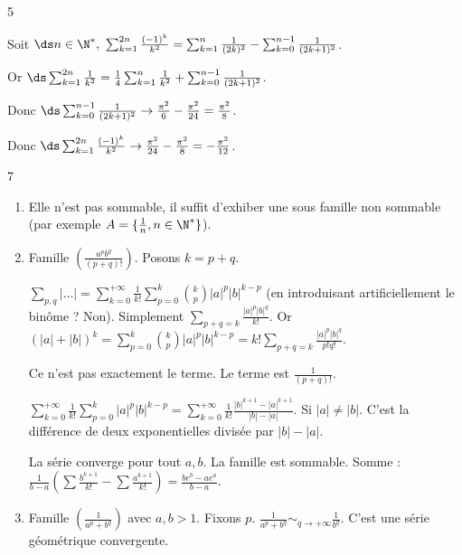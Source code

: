\begin{correction}{5}

Soit $\ds n \in \N^*,~ \sum_{k=1}^{2n} \frac {(-1)^k} {k^2} = \sum_{k=1}^n \frac 1 {(2k)^2} - \sum_{k=0}^{n-1} \frac 1 {(2k+1)^2}$.    

Or $\ds \sum_{k=1}^{2n} \frac 1 {k^2} = \frac 1 4 \sum_{k=1}^n \frac 1 {k^2} + \sum_{k=0}^{n-1} \frac 1 {(2k+1)^2}$.

Donc $\ds \sum_{k=0}^{n-1} \frac 1 {(2k+1)^2} \to \frac {\pi^2} 6 - \frac {\pi^2} {24} = \frac {\pi^2} 8$.

Donc $\ds \sum_{k=1}^{2n} \frac {(-1)^k} {k^2} \to \frac {\pi^2} {24} - \frac {\pi^2} 8 = - \frac {\pi^2} {12}$.
\end{correction}

\begin{correction}{7}
\begin{enumerate}
    \item Elle n'est pas sommable, il suffit d'exhiber une sous famille non sommable (par exemple $A = \{\frac 1 n, n \in \N^*\}$).
    
    \item 
        Famille $\left(\frac{a^p b^q}{(p+q)!}\right)$.
        Posons $k=p+q$.
        
        $\sum_{p,q} | \dots | = \sum_{k=0}^{+ \infty} \frac{1}{k!} \sum_{p=0}^k \binom{k}{p} |a|^p |b|^{k-p}$ 
        (en introduisant artificiellement le binôme ? Non).
        Simplement $\sum_{p+q=k} \frac{|a|^p |b|^q}{k!}$.
        Or $(|a|+|b|)^k = \sum_{p=0}^k \binom{k}{p} |a|^p |b|^{k-p} = k! \sum_{p+q=k} \frac{|a|^p |b|^q}{p! q!}$.

        Ce n'est pas exactement le terme.
        Le terme est $\frac{1}{(p+q)!}$.

        $\sum_{k=0}^{+ \infty} \frac{1}{k!} \sum_{p=0}^k |a|^p |b|^{k-p} = \sum_{k=0}^{+ \infty} \frac{1}{k!} \frac{|b|^{k+1}-|a|^{k+1}}{|b|-|a|}$.
        Si $|a| \neq |b|$. C'est la différence de deux exponentielles divisée par $|b|-|a|$.

        La série converge pour tout $a,b$. La famille est sommable.
        Somme : $\frac{1}{b-a} \left(\sum \frac{b^{k+1}}{k!} - \sum \frac{a^{k+1}}{k!}\right) = \frac{b e^b - a e^a}{b-a}$.

    \item 
        Famille $\left(\frac{1}{a^p+b^q}\right)$ avec $a,b > 1$.
        Fixons $p$. $\frac{1}{a^p+b^q} \sim_{q \to + \infty} \frac{1}{b^q}$. C'est une série géométrique convergente.


\end{enumerate}
\end{correction}
